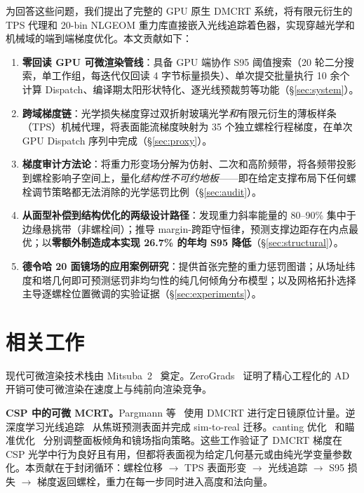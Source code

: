 \documentclass[12pt,a4paper]{ctexart}
\begin{document}
为回答这些问题，我们提出了完整的 GPU 原生 DMCRT 系统，将有限元衍生的 TPS 代理和 20-bin NLGEOM 重力库直接嵌入光线追踪着色器，实现穿越光学和机械域的端到端梯度优化。本文贡献如下：

\begin{enumerate}
  \item \textbf{零回读 GPU 可微渲染管线}：具备 GPU 端协作 S95 阈值搜索（20 轮二分搜索，单工作组，每迭代仅回读 4 字节标量损失）、单次提交批量执行 10 余个计算 Dispatch、编译期太阳形状特化、逐光线预裁剪等功能（\S\ref{sec:system}）。

  \item \textbf{跨域梯度链}：光学损失梯度穿过双折射玻璃光学\emph{和}有限元衍生的薄板样条（TPS）机械代理，将表面能流梯度映射为 35 个独立螺栓行程梯度，在单次 GPU Dispatch 序列中完成（\S\ref{sec:proxy}）。

  \item \textbf{梯度审计方法论}：将重力形变场分解为仿射、二次和高阶频带，将各频带投影到螺栓影响子空间上，量化\emph{结构性不可约地板}——即在给定支撑布局下任何螺栓调节策略都无法消除的光学惩罚比例（\S\ref{sec:audit}）。

  \item \textbf{从面型补偿到结构优化的两级设计路径}：发现重力斜率能量的 80--90\% 集中于边缘悬挑带（非螺栓间）；推导 margin-跨距守恒律，预测支撑边距存在内点最优；以\textbf{零额外制造成本实现 26.7\% 的年均 S95 降低}（\S\ref{sec:structural}）。

  \item \textbf{德令哈 20 面镜场的应用案例研究}：提供首张完整的重力惩罚图谱；从场址纬度和塔几何即可预测惩罚非均匀性的纯几何倾角分布模型；以及网格拓扑选择主导逐螺栓位置微调的实验证据（\S\ref{sec:experiments}）。
\end{enumerate}

\section{相关工作}

现代可微渲染技术栈由 Mitsuba~2~\cite{mitsuba2} 奠定。ZeroGrads~\cite{zerograds} 证明了精心工程化的 AD 开销可使可微渲染在速度上与纯前向渲染竞争。

\textbf{CSP 中的可微 MCRT。}Pargmann 等~\cite{pargmann2024} 使用 DMCRT 进行定日镜原位计量。逆深度学习光线追踪~\cite{inverse2025a,inverse2025b} 从焦斑预测表面并完成 sim-to-real 迁移。canting 优化~\cite{canting2025} 和瞄准优化~\cite{aiming2025} 分别调整面板倾角和镜场指向策略。这些工作验证了 DMCRT 梯度在 CSP 光学中行为良好且有用，但都将表面视为给定几何基元或由纯光学变量参数化。本贡献在于封闭循环：螺栓位移 $\rightarrow$ TPS 表面形变 $\rightarrow$ 光线追踪 $\rightarrow$ S95 损失 $\rightarrow$ 梯度返回螺栓，重力在每一步同时进入高度和法向量。
\end{document}

